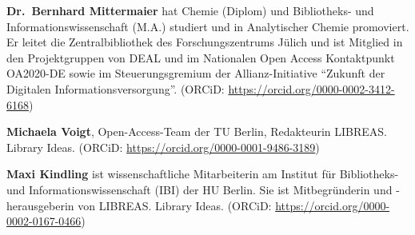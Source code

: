 \documentclass[a4paper,
fontsize=11pt,
oneside,
numbers=noperiodatend,
parskip=half-,
bibliography=totoc,
final
]{scrartcl}
\begin{document}
\textbf{Dr.~Bernhard Mittermaier} hat Chemie (Diplom) und Bibliotheks-
und Informationswissenschaft (M.A.) studiert und in Analytischer Chemie
promoviert. Er leitet die Zentralbibliothek des Forschungszentrums
Jülich und ist Mitglied in den Projektgruppen von DEAL und im Nationalen
Open Access Kontaktpunkt OA2020-DE sowie im Steuerungsgremium der
Allianz-Initiative \enquote{Zukunft der Digitalen Informationsversorgung}.
(ORCiD: \url{https://orcid.org/0000-0002-3412-6168})

\textbf{Michaela Voigt}, Open-Access-Team der TU Berlin, Redakteurin
LIBREAS. Library Ideas. (ORCiD:
\url{https://orcid.org/0000-0001-9486-3189})

\textbf{Maxi Kindling} ist wissenschaftliche Mitarbeiterin am Institut
für Bibliotheks- und Informationswissenschaft (IBI) der HU Berlin. Sie
ist Mitbegründerin und -herausgeberin von LIBREAS. Library Ideas.
(ORCiD: \url{https://orcid.org/0000-0002-0167-0466})
\end{document}
